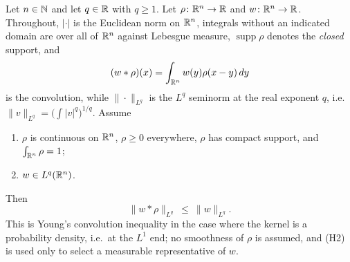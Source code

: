 \begin{helper}
Let $n\in\mathbb{N}$ and let $q\in\mathbb{R}$ with $q\ge1$.  Let $\rho\colon\mathbb{R}^n\to\mathbb{R}$ and
$w\colon\mathbb{R}^n\to\mathbb{R}$.  Throughout, $|\cdot|$ is the Euclidean norm on $\mathbb{R}^n$,
integrals without an indicated domain are over all of $\mathbb{R}^n$ against Lebesgue
measure, $\operatorname{supp}\rho$ denotes the \emph{closed} support, and
\[
(w*\rho)(x)=\int_{\mathbb{R}^n}w(y)\rho(x-y)\,dy
\]
is the convolution, while $\|\cdot\|_{L^q}$ is the $L^q$ seminorm at the real
exponent $q$, i.e.\ $\|v\|_{L^q}=\bigl(\int|v|^q\bigr)^{1/q}$.  Assume
\begin{enumerate}
\item[(H1)] $\rho$ is continuous on $\mathbb{R}^n$, $\rho\ge0$ everywhere, $\rho$ has
  compact support, and $\int_{\mathbb{R}^n}\rho=1$;
\item[(H2)] $w\in L^q(\mathbb{R}^n)$.
\end{enumerate}
Then
\[
\|w*\rho\|_{L^q}\ \le\ \|w\|_{L^q}.
\]
This is Young's convolution inequality in the case where the kernel is a
probability density, i.e.\ at the $L^1$ end; no smoothness of $\rho$ is
assumed, and (H2) is used only to select a measurable representative of $w$.
\end{helper}

